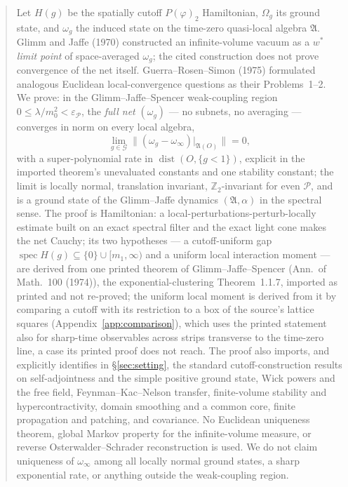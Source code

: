 \documentclass[11pt,a4paper]{article}
\theoremstyle{plain}
\theoremstyle{definition}
\theoremstyle{plain}
\theoremstyle{definition}
\newcommand{\Z}{\mathbb{Z}}
\newcommand{\A}{\mathfrak{A}}
\newcommand{\G}{\mathcal{G}}
\newcommand{\Om}{\Omega}
\DeclareMathOperator{\dist}{dist}
\DeclareMathOperator{\spec}{spec}
\begin{document}
\begin{abstract}
Let $H(g)$ be the spatially cutoff $P(\varphi)_2$ Hamiltonian, $\Om_g$ its ground state, and
$\omega_g$ the induced state on the time-zero quasi-local algebra $\A$. Glimm and Jaffe (1970)
constructed an infinite-volume vacuum as a $w^*$ \emph{limit point} of space-averaged $\omega_g$;
the cited construction does not prove convergence of the net itself. Guerra--Rosen--Simon
(1975) formulated analogous Euclidean local-convergence questions as their Problems~1--2.
We prove: in the Glimm--Jaffe--Spencer weak-coupling region
$0\le\lambda/m_0^2<\varepsilon_{\mathscr P}$, the \emph{full net} $(\omega_g)$ --- no subnets, no
averaging --- converges in norm on every local algebra,
\[
  \lim_{g\in\G}\bigl\|(\omega_g-\omega_\infty)|_{\A(O)}\bigr\|=0 ,
\]
with a super-polynomial rate in $\dist(O,\{g<1\})$, explicit in the imported theorem's
unevaluated constants and one stability constant; the limit is locally normal,
translation invariant, $\Z_2$-invariant for even $\mathscr P$, and is a ground state of the
Glimm--Jaffe dynamics $(\A,\alpha)$ in the spectral sense. The proof is Hamiltonian: a
local-perturbations-perturb-locally estimate built on an exact spectral filter and the exact
light cone makes the net Cauchy; its two hypotheses --- a cutoff-uniform gap
$\spec H(g)\subseteq\{0\}\cup[m_1,\infty)$ and a uniform local interaction moment --- are derived
from one printed theorem of Glimm--Jaffe--Spencer (Ann.\ of Math.\ 100 (1974)), the
exponential-clustering Theorem~1.1.7, imported as printed and not re-proved; the uniform
local moment is derived from it by comparing a cutoff with its restriction to a box of the
source's lattice squares (Appendix~\ref{app:comparison}), which uses the printed statement
also for sharp-time observables across strips transverse to the time-zero line, a case its
printed proof does not reach.
The proof also imports, and explicitly identifies in \S\ref{sec:setting}, the standard
cutoff-construction results on self-adjointness and the simple positive ground state, Wick
powers and the free field, Feynman--Kac--Nelson transfer, finite-volume stability and
hypercontractivity, domain smoothing
and a common core, finite propagation and patching, and covariance. No Euclidean uniqueness
theorem, global Markov property for the infinite-volume measure, or reverse
Osterwalder--Schrader reconstruction is used. We do not claim uniqueness of $\omega_\infty$
among all locally normal ground states, a sharp exponential rate, or anything outside the
weak-coupling region.
\end{abstract}
\end{document}
